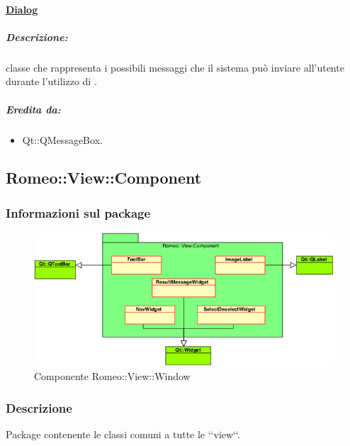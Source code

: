 		\paragraph{\underline{Dialog}}
		\label{dia}
			\subparagraph{Descrizione:} classe che rappresenta i possibili messaggi che il sistema può inviare all'utente durante l'utilizzo di \project{}.
			\subparagraph{Eredita da:}
				\begin{itemize}
				\item Qt::QMessageBox.
				\end{itemize}


	\pagebreak


	\subsection{Romeo::View::Component}
	\label{romeo::view::component}
		\subsubsection{Informazioni sul package}
		\label{info_component}
		\begin{figure}[!h]
			\centering
			\includegraphics[width=\linewidth]{./Content/Immagini/Romeo__View__Component.png}
			\caption{Componente Romeo::View::Window}
			\label{comp_romeo::view::component}
		\end{figure}
		\subsubsection{Descrizione}
		\label{descr_component}
		Package\glossario{} contenente le classi comuni a tutte le \lq{}\lq{}view\lq{}\lq{}.
		
